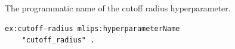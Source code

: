 The programmatic name of the cutoff radius hyperparameter.
\begin{lstlisting}[language=turtle]
ex:cutoff-radius mlips:hyperparameterName
    "cutoff_radius" .
\end{lstlisting}
